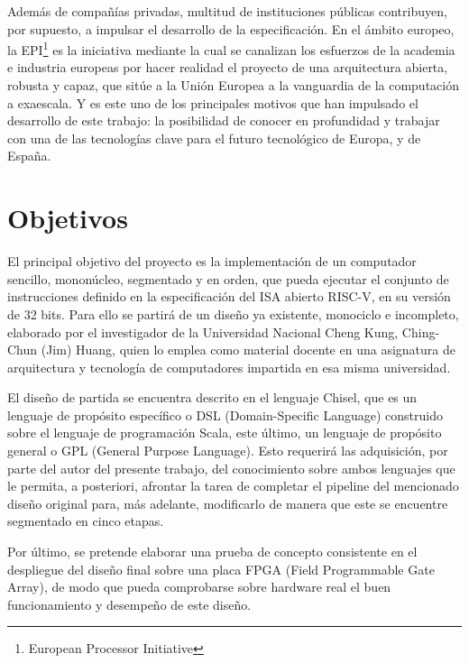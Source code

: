 Además de compañías privadas, multitud de instituciones públicas contribuyen, por supuesto, a impulsar el desarrollo de la especificación. En el ámbito europeo, la EPI\footnote{European Processor Initiative} es la iniciativa mediante la cual se canalizan los esfuerzos de la academia e industria europeas por hacer realidad el proyecto de una arquitectura abierta, robusta y capaz, que sitúe a la Unión Europea a la vanguardia de la computación a exaescala. Y es este uno de los principales motivos que han impulsado el desarrollo de este trabajo: la posibilidad de conocer en profundidad y trabajar con una de las tecnologías clave para el futuro tecnológico de Europa, y de España.


\section{Objetivos}

El principal objetivo del proyecto es la implementación de un computador sencillo, mononúcleo, segmentado y en orden, que pueda ejecutar el conjunto de instrucciones definido en la especificación del ISA abierto RISC-V, en su versión de 32 bits. Para ello se partirá de un diseño ya existente, monociclo e incompleto, elaborado por el investigador de la Universidad Nacional Cheng Kung, Ching-Chun (Jim) Huang, quien lo emplea como material docente en una asignatura de arquitectura y tecnología de computadores impartida en esa misma universidad.

El diseño de partida se encuentra descrito en el lenguaje Chisel, que es un lenguaje de propósito específico o DSL (Domain-Specific Language) construido sobre el lenguaje de programación Scala, este último, un lenguaje de propósito general o GPL (General Purpose Language). Esto requerirá las adquisición, por parte del autor del presente trabajo, del conocimiento sobre ambos lenguajes que le permita, a posteriori, afrontar la tarea de completar el pipeline del mencionado diseño original para, más adelante, modificarlo de manera que este se encuentre segmentado en cinco etapas.

Por último, se pretende elaborar una prueba de concepto consistente en el despliegue del diseño final sobre una placa FPGA (Field Programmable Gate Array), de modo que pueda comprobarse sobre hardware real el buen funcionamiento y desempeño de este diseño.



